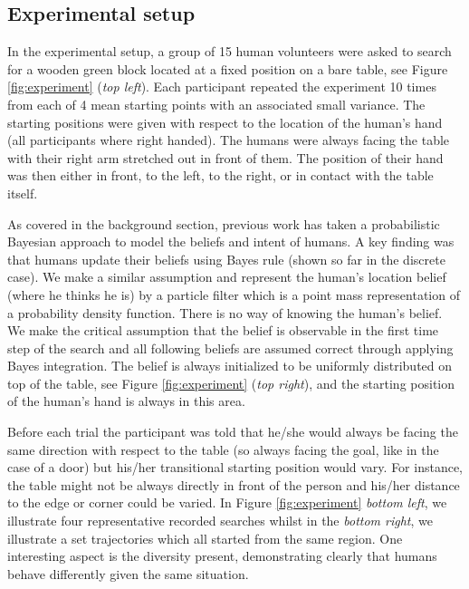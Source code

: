 \subsection{Experimental setup}

In the experimental setup, a group of 15 human volunteers were asked to search for a
wooden green block located at a fixed position on a bare table, see Figure \ref{fig:experiment} (\textit{top left}). 
Each participant repeated the experiment 10 times from each of 4 mean starting points with an associated small variance. 
The starting positions were given with respect to the
location of the human's hand (all participants where right handed). The humans were always facing the table with their right 
arm stretched out in front of them. The 
position of their hand was then either in front, to the left, to the right, or in contact with the table itself. 

As covered in the background section, previous work has taken a probabilistic Bayesian approach to model the beliefs and intent 
of humans. A key finding was that humans update their beliefs using Bayes rule (shown so far in the discrete case). 
We make a similar assumption and represent the human's location belief (where he thinks he is) by a particle filter which
is a point mass representation of a probability density function. There is no way of
knowing the human's belief. We make the critical assumption that the belief is observable in the first time step of the search and all following beliefs 
are assumed correct through applying Bayes integration.
The belief is always initialized to be uniformly distributed on top of the table, 
see Figure \ref{fig:experiment} (\textit{top right}), and the starting position of the human's hand is always in this area.

Before each trial the participant was told that he/she would always be facing the same direction with respect to the table (so always facing the goal, 
like in the case of a door) but his/her transitional starting position would vary. 
For instance, the table might not be always directly in front of the person and his/her distance to the edge or 
corner could be varied. In Figure \ref{fig:experiment}
\textit{bottom left}, we illustrate four representative recorded searches whilst in the \textit{bottom right}, we illustrate a set trajectories 
which all started from the same region. One interesting aspect is the diversity present,
demonstrating clearly that humans behave differently given the same situation.  

